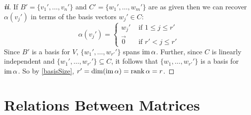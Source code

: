 \documentclass[../main.tex]{subfiles}
\begin{document}
\begin{proof}[\textbf{ii}]
  If $B' = \{v_1', \ldots, v_n'\}$ and $C' = \{w_1', \ldots, w_m'\}$ are as given then we can recover $\alpha(v_j')$ in terms of the basis vectors $w_j' \in C$:
  \[
    \alpha(v_j') = \begin{cases}
    w_j' & \text{ if } 1 \leq j \leq r' \\
    \vec{0} & \text{ if } r' < j \leq r'
    \end{cases}
  \]
  Since $B'$ is a basis for $V$, $\{w_1', \ldots, w_{r'}'\}$ spans $\operatorname{im} \alpha$.
  Further, since $C$ is linearly independent and $\{w_1', \ldots, w_{r'}'\} \subseteq C$, it follows that $\{w_1, \ldots, w_{r'}'\}$ is a basis for $\operatorname{im} \alpha$.
  So by \cref{basisSize}, $r' = \dim(\operatorname{im} \alpha) = \operatorname{rank} \alpha = r$.
\end{proof}
\section{Relations Between Matrices}
\end{document}
